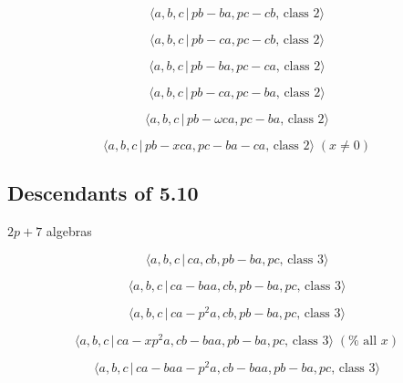 \documentclass[10pt]{article}
\begin{document}
\begin{equation}
\langle a,b,c\,|\,pb-ba,pc-cb,\,\text{class }2\rangle  \tag{7.670}
\end{equation}

\begin{equation}
\langle a,b,c\,|\,pb-ca,pc-cb,\,\text{class }2\rangle  \tag{7.671}
\end{equation}

\begin{equation}
\langle a,b,c\,|\,pb-ba,pc-ca,\,\text{class }2\rangle  \tag{7.672}
\end{equation}

\begin{equation}
\langle a,b,c\,|\,pb-ca,pc-ba,\,\text{class }2\rangle  \tag{7.673}
\end{equation}

\begin{equation}
\langle a,b,c\,|\,pb-\omega ca,pc-ba,\,\text{class }2\rangle  \tag{7.674}
\end{equation}

\begin{equation}
\langle a,b,c\,|\,pb-xca,pc-ba-ca,\,\text{class }2\rangle \;(x \neq 0) 
\tag{7.675}
\end{equation}

\subsection{Descendants of 5.10}

$2p+7$ algebras

\begin{equation}
\langle a,b,c\,|\,ca,cb,pb-ba,pc,\,\text{class }3\rangle  \tag{7.676}
\end{equation}

\begin{equation}
\langle a,b,c\,|\,ca-baa,cb,pb-ba,pc,\,\text{class }3\rangle  \tag{7.677}
\end{equation}

\begin{equation}
\langle a,b,c\,|\,ca-p^2a,cb,pb-ba,pc,\,\text{class }3\rangle  \tag{7.678}
\end{equation}

\begin{equation}
\langle a,b,c\,|\,ca-xp^2a,cb-baa,pb-ba,pc,\,\text{class }3\rangle \;(\text{%
all }x)  \tag{7.679}
\end{equation}

\begin{equation}
\langle a,b,c\,|\,ca-baa-p^2a,cb-baa,pb-ba,pc,\,\text{class }3\rangle 
\tag{7.680}
\end{equation}
\end{document}
